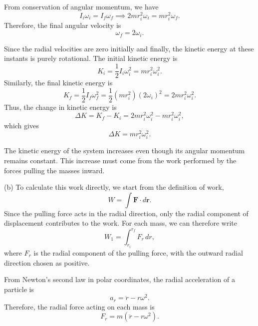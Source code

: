 \documentclass[12pt]{article}
\begin{document}
From conservation of angular momentum, we have
\begin{equation}
    I_i\omega_i=I_f\omega_f
    \implies
    2mr_i^2\omega_i=mr_i^2\omega_f.
\end{equation}
Therefore, the final angular velocity is
\begin{equation}
    \boxed{\omega_f=2\omega_i}.
\end{equation}

Since the radial velocities are zero initially and finally, the kinetic energy at these instants is purely rotational. The initial kinetic energy is
\begin{equation}
    K_i=\frac{1}{2}I_i\omega_i^2
    =mr_i^2\omega_i^2.
\end{equation}
Similarly, the final kinetic energy is
\begin{equation}
    K_f=\frac{1}{2}I_f\omega_f^2
    =\frac{1}{2}(mr_i^2)(2\omega_i)^2
    =2mr_i^2\omega_i^2.
\end{equation}
Thus, the change in kinetic energy is
\begin{equation}
    \Delta K=K_f-K_i
    =2mr_i^2\omega_i^2-mr_i^2\omega_i^2,
\end{equation}
which gives
\begin{equation}
    \boxed{\Delta K=mr_i^2\omega_i^2}.
\end{equation}

The kinetic energy of the system increases even though its angular momentum remains constant. This increase must come from the work performed by the forces pulling the masses inward.

(b) To calculate this work directly, we start from the definition of work,
\begin{equation}
    W=\int\mathbf{F}\cdot d\mathbf{r}.
\end{equation}
Since the pulling force acts in the radial direction, only the radial component of displacement contributes to the work. For each mass, we can therefore write
\begin{equation}
    W_1=\int_{r_i}^{r_f}F_r\,dr,
\end{equation}
where $F_r$ is the radial component of the pulling force, with the outward radial direction chosen as positive.

From Newton's second law in polar coordinates, the radial acceleration of a particle is
\begin{equation}
    a_r=\ddot{r}-r\omega^2.
\end{equation}
Therefore, the radial force acting on each mass is
\begin{equation}
    F_r=m(\ddot{r}-r\omega^2).
\end{equation}
\end{document}
